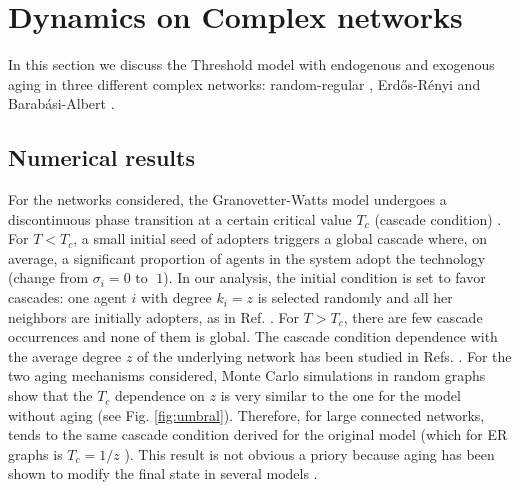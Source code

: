 \section{\label{sec:Complex networks} Dynamics on Complex networks}

In this section we discuss the Threshold model with endogenous and exogenous aging in three different complex networks: random-regular \cite{wormald1999models}, Erd\H{o}s-R\'enyi \cite{erdos1960evolution} and Barab\'asi-Albert \cite{barabasi2009scale}.

\subsection{\label{subsec:Numerical results} Numerical results}

For the networks considered, the Granovetter-Watts model undergoes a discontinuous phase transition at a certain critical value $T_{c}$ (cascade condition) \cite{watts-2002}. For $T<T_c$, a small initial seed of adopters triggers a global cascade where, on average, a significant proportion of agents in the system adopt the technology (change from $\sigma_i = 0 \mbox{ to } \; 1$). In our analysis, the initial condition is set to favor cascades: one agent $i$ with degree $k_i = z$ is selected randomly and all her neighbors are initially adopters, as in Ref. \cite{centola-2007,singh-2013}. For $T>T_c$, there are few cascade occurrences and none of them is global. The cascade condition dependence with the average degree $z$ of the underlying network has been studied in Refs. \cite{watts-2002, gleeson-2007}. For the two aging mechanisms considered, Monte Carlo simulations in random graphs show that the $T_c$ dependence on $z$ is very similar to the one for the model without aging (see Fig. \ref{fig:umbral}). Therefore, for large connected networks, tends to the same cascade condition derived for the original model (which for ER graphs is $T_{c} = 1 / z$ \cite{watts-2002}). This result is not obvious a priory because aging has been shown to modify the final state in several models \cite{fernandez-gracia-2013,artime-2018,peralta-2020C,peralta-2020A,chen-2020,fernandez-gracia-2011,perez-2016,stark-2008}. 

